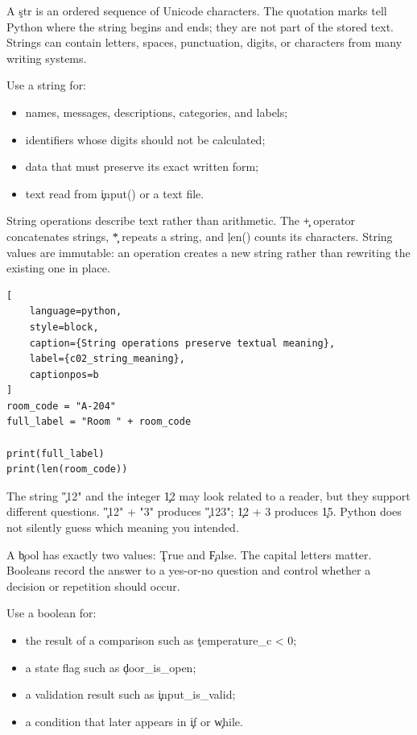 
A \c{str} is an ordered sequence of Unicode characters. The quotation marks
tell Python where the string begins and ends; they are not part of the stored
text. Strings can contain letters, spaces, punctuation, digits, or characters
from many writing systems.

Use a string for:
\begin{itemize}
    \item names, messages, descriptions, categories, and labels;
    \item identifiers whose digits should not be calculated;
    \item data that must preserve its exact written form;
    \item text read from \c{input()} or a text file.
\end{itemize}

String operations describe text rather than arithmetic. The \c{+} operator
concatenates strings, \c{*} repeats a string, and \c{len()} counts its
characters. String values are immutable: an operation creates a new string
rather than rewriting the existing one in place.

\begin{lstlisting}[
    language=python,
    style=block,
    caption={String operations preserve textual meaning},
    label={c02_string_meaning},
    captionpos=b
]
room_code = "A-204"
full_label = "Room " + room_code

print(full_label)
print(len(room_code))
\end{lstlisting}

The string \c{"12"} and the integer \c{12} may look related to a reader, but
they support different questions. \c{"12" + "3"} produces \c{"123"};
\c{12 + 3} produces \c{15}. Python does not silently guess which meaning you
intended.


A \c{bool} has exactly two values: \c{True} and \c{False}. The capital letters
matter. Booleans record the answer to a yes-or-no question and control whether
a decision or repetition should occur.

Use a boolean for:
\begin{itemize}
    \item the result of a comparison such as \c{temperature_c < 0};
    \item a state flag such as \c{door_is_open};
    \item a validation result such as \c{input_is_valid};
    \item a condition that later appears in \c{if} or \c{while}.
\end{itemize}

